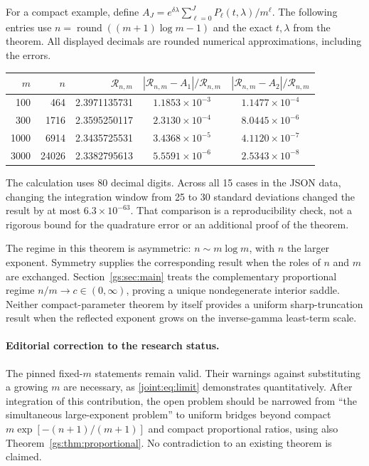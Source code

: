 For a compact example, define
$A_J=e^{\delta\lambda}\sum_{\ell=0}^JP_\ell(t,\lambda)/m^\ell$.
The following entries use
$n=\operatorname{round}((m+1)\log m-1)$ and the exact $t,\lambda$
from the theorem. All displayed decimals are rounded numerical
approximations, including the errors.
\begin{center}
\begin{tabular}{rrrcc}
\hline
$m$ & $n$ & $\mathcal R_{n,m}$ & $|\mathcal R_{n,m}-A_1|/\mathcal R_{n,m}$
   & $|\mathcal R_{n,m}-A_2|/\mathcal R_{n,m}$\\
\hline
100 & 464 & 2.3971135731 & $1.1853\times10^{-3}$ & $1.1477\times10^{-4}$\\
300 & 1716 & 2.3595250117 & $2.3130\times10^{-4}$ & $8.0445\times10^{-6}$\\
1000 & 6914 & 2.3435725531 & $3.4368\times10^{-5}$ & $4.1120\times10^{-7}$\\
3000 & 24026 & 2.3382795613 & $5.5591\times10^{-6}$ & $2.5343\times10^{-8}$\\
\hline
\end{tabular}
\end{center}
The calculation uses 80 decimal digits. Across all 15 cases in the
JSON data, changing the integration window from 25 to 30 standard
deviations changed the result by at most $6.3\times10^{-63}$.
That comparison is a reproducibility check, not a rigorous bound
for the quadrature error or an additional proof of the theorem.

The regime in this theorem is asymmetric: $n\sim m\log m$, with
$n$ the larger exponent. Symmetry supplies the corresponding result
when the roles of $n$ and $m$ are exchanged. Section~\ref{gs:sec:main} treats the complementary proportional regime
$n/m\to c\in(0,\infty)$, proving a unique nondegenerate interior saddle.
Neither compact-parameter theorem by itself provides a
uniform sharp-truncation result when the reflected exponent grows
on the inverse-gamma least-term scale.

\paragraph{Editorial correction to the research status.}
The pinned fixed-$m$ statements remain valid. Their warnings against
substituting a growing $m$ are necessary, as
\eqref{joint:eq:limit} demonstrates quantitatively. After integration
of this contribution, the open problem should be narrowed from
``the simultaneous large-exponent problem'' to uniform bridges beyond compact
$m\exp[-(n+1)/(m+1)]$ and compact proportional ratios,
using also Theorem~\ref{gs:thm:proportional}. No contradiction to an existing theorem is
claimed.

